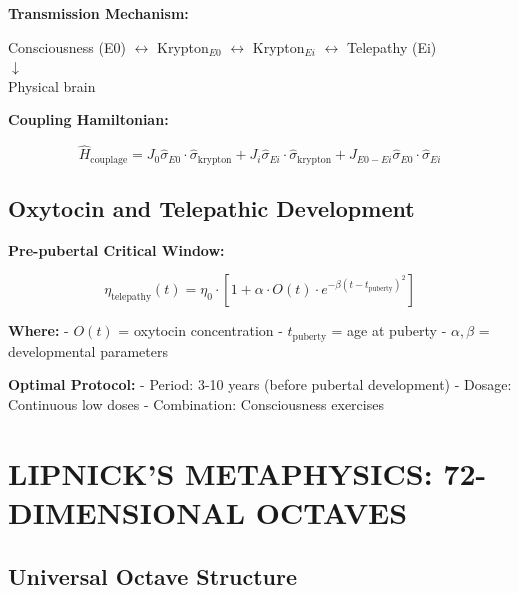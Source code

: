 \documentclass[11pt]{article}
\begin{document}
\textbf{Transmission Mechanism:}

\begin{center}
Consciousness (E0) $\leftrightarrow$ Krypton$_{E0}$ $\leftrightarrow$ Krypton$_{Ei}$ $\leftrightarrow$ Telepathy (Ei) \\
$\downarrow$ \\
Physical brain
\end{center}

\textbf{Coupling Hamiltonian:}

\begin{equation}
\hat{H}_{\text{couplage}} = J_0 \hat{\sigma}_{E0} \cdot \hat{\sigma}_{\text{krypton}} + J_i \hat{\sigma}_{Ei} \cdot \hat{\sigma}_{\text{krypton}} + J_{E0-Ei} \hat{\sigma}_{E0} \cdot \hat{\sigma}_{Ei}
\end{equation}

\hypertarget{oxytocin-and-telepathic-development}{%
\subsection{Oxytocin and Telepathic
Development}\label{oxytocin-and-telepathic-development}}

\textbf{Pre-pubertal Critical Window:}

\begin{equation}
\eta_{\text{telepathy}}(t) = \eta_0 \cdot \left[1 + \alpha \cdot O(t) \cdot e^{-\beta(t - t_{\text{puberty}})^2}\right]
\end{equation}

\textbf{Where:} - \(O(t)\) = oxytocin concentration -
\(t_{\text{puberty}}\) = age at puberty - \(\alpha, \beta\) =
developmental parameters

\textbf{Optimal Protocol:} - Period: 3-10 years (before pubertal
development) - Dosage: Continuous low doses - Combination: Consciousness
exercises

\hypertarget{lipnicks-metaphysics-72-dimensional-octaves-1}{%
\section{LIPNICK'S METAPHYSICS: 72-DIMENSIONAL
OCTAVES}\label{lipnicks-metaphysics-72-dimensional-octaves-1}}

\hypertarget{universal-octave-structure-1}{%
\subsection{Universal Octave
Structure}\label{universal-octave-structure-1}}
\end{document}

